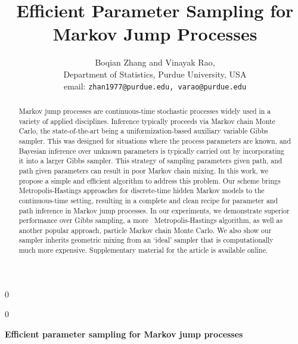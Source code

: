 \documentclass[12pt]{article}
\newcommand{\blind}{0}
\begin{document}
%

\def\spacingset#1{\renewcommand{\baselinestretch}%
{#1}\small\normalsize} \spacingset{1}



\blind
{
  \title{\bf Efficient Parameter Sampling for Markov Jump Processes}
  \author{Boqian Zhang and Vinayak Rao, \\
          Department of Statistics, Purdue University, USA \\
          email: \texttt{zhan1977@purdue.edu, varao@purdue.edu}
  }
  \maketitle
} \fi

\blind
{
  \bigskip
  \bigskip
  \bigskip
  \begin{center}
    {\LARGE\bf Efficient parameter sampling for Markov jump processes}
\end{center}
  \medskip
} \fi

\bigskip
\begin{abstract}
Markov jump processes  are continuous-time stochastic processes widely used in a variety of applied disciplines. 
Inference typically proceeds via Markov chain Monte Carlo, the state-of-the-art being a uniformization-based auxiliary variable Gibbs sampler. 
This was designed for situations where the process parameters are known, and Bayesian inference over unknown parameters is typically carried out by incorporating it into a larger Gibbs sampler.
This strategy of sampling parameters given path, and path given parameters can result in poor Markov chain mixing. 
In this work, we propose a simple and efficient algorithm to address this problem. 
Our scheme brings Metropolis-Hastings approaches for discrete-time hidden Markov models to the continuous-time setting, resulting in a complete and clean recipe for parameter and path inference in Markov jump processes. 
In our experiments, we demonstrate superior performance over Gibbs sampling, a more \naive\ Metropolis-Hastings algorithm, as well as another popular approach, particle Markov chain Monte Carlo.
We also show our sampler inherits geometric mixing from an `ideal' sampler that is computationally much more expensive.
Supplementary material for the article is available online.
\end{abstract}
\end{document}
